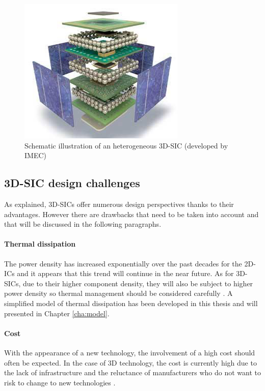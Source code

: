 \begin{figure}[h!]
\begin{center}
\includegraphics[width=0.5\linewidth]{heterogeneity.png}
\end{center}
\vspace{-0.5cm}
\caption{Schematic illustration of an heterogeneous 3D-SIC (developed by IMEC) \cite{4198870}}
\label{fig:heterogeneity}
\end{figure}

\subsection{3D-SIC design challenges}

As explained, 3D-SICs offer numerous design perspectives thanks to their advantages. However there are drawbacks that need to be taken into account and that will be discussed in the following paragraphs.

\paragraph{Thermal dissipation}
The power density has increased exponentially over the past decades for the 2D-ICs and it appears that this trend will continue in the near future. As for 3D-SICs, due to their higher component density, they will also be subject to higher power density so thermal management should be considered carefully \cite{659500}. A simplified model of thermal dissipation has been developed in this thesis and will presented in Chapter \ref{cha:model}.

\paragraph{Cost}
With the appearance of a new technology, the involvement of a high cost should often be expected. In the case of 3D technology, the cost is currently high due to the lack of infrastructure and the reluctance of manufacturers who do not want to risk to change to new technologies \cite{659500}.

